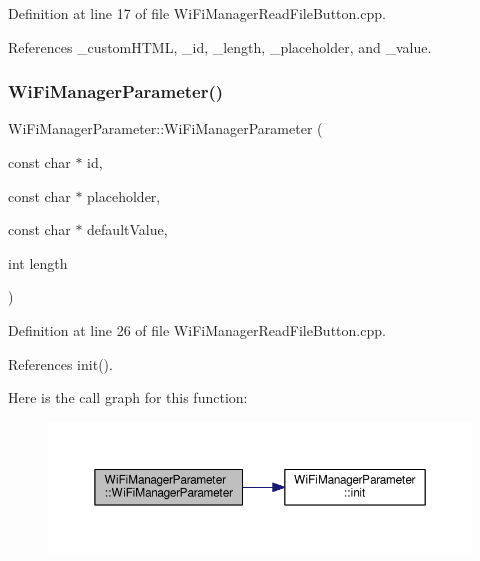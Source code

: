 Definition at line 17 of file Wi\+Fi\+Manager\+Read\+File\+Button.\+cpp.



References \+\_\+custom\+H\+T\+ML, \+\_\+id, \+\_\+length, \+\_\+placeholder, and \+\_\+value.

\mbox{\label{class_wi_fi_manager_parameter_a8e55ac907530d04ab60d30045e1382a1}} 
\subsubsection{\texorpdfstring{Wi\+Fi\+Manager\+Parameter()}{WiFiManagerParameter()}\hspace{0.1cm}{\footnotesize\ttfamily [2/3]}}
{\footnotesize\ttfamily Wi\+Fi\+Manager\+Parameter\+::\+Wi\+Fi\+Manager\+Parameter (\begin{DoxyParamCaption}\item[{const char $\ast$}]{id,  }\item[{const char $\ast$}]{placeholder,  }\item[{const char $\ast$}]{default\+Value,  }\item[{int}]{length }\end{DoxyParamCaption})}



Definition at line 26 of file Wi\+Fi\+Manager\+Read\+File\+Button.\+cpp.



References init().

Here is the call graph for this function\+:\nopagebreak
\begin{figure}[H]
\begin{center}
\leavevmode
\includegraphics[width=350pt]{d7/d08/class_wi_fi_manager_parameter_a8e55ac907530d04ab60d30045e1382a1_cgraph}
\end{center}
\end{figure}
\mbox{\label{class_wi_fi_manager_parameter_a45967e1d29d52f5fc8e47e99cb693b98}} 
